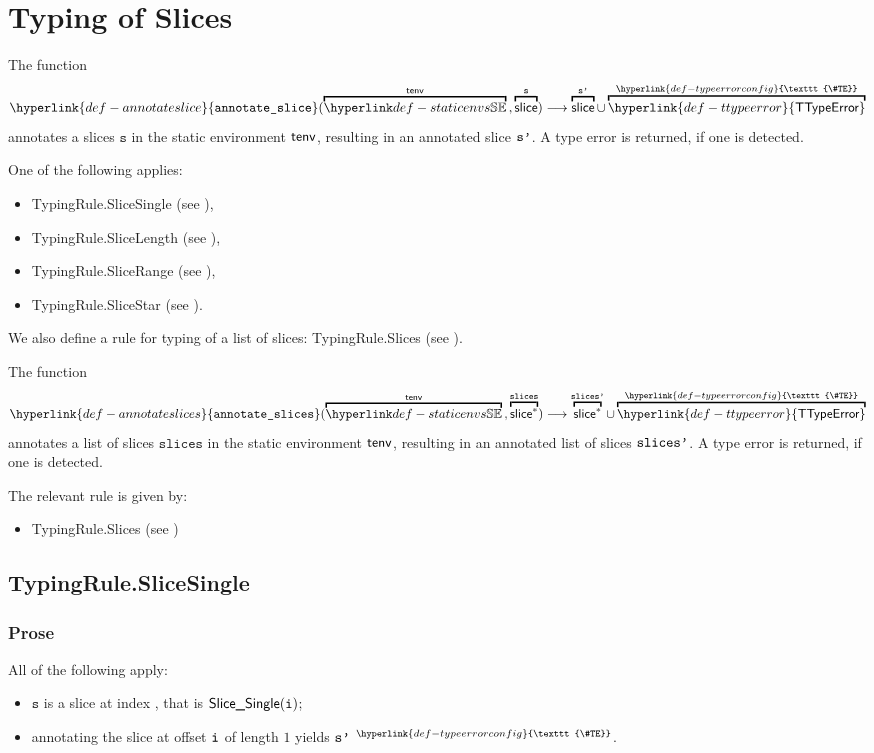 \documentclass{book}
\newcommand\TTypeError[0]{\hyperlink{def-ttypeerror}{\textsf{TTypeError}}}
\newcommand\TypeErrorConfig[0]{\hyperlink{def-typeerrorconfig}{\texttt{\#TE}}}
\newcommand\ProseOrTypeError[0]{\hyperlink{def-proseortypeerror}{$^{\TypeErrorConfig}$}}
\newcommand\annotateslice[0]{\hyperlink{def-annotateslice}{\texttt{annotate\_slice}}}
\newcommand\annotateslices[0]{\hyperlink{def-annotateslices}{\texttt{annotate\_slices}}}
\newcommand\vs[0]{\texttt{s}}
\newcommand\slices[0]{\texttt{slices}}
\begin{document}
\chapter{Typing of Slices \label{chap:typingslices}}
\hypertarget{def-annotateslice}{}
The function
\[
  \annotateslice(\overname{\staticenvs}{\tenv} \aslsep \overname{\slice}{\vs})
  \aslto
  \overname{\slice}{\vsp} \cup \overname{\TTypeError}{\TypeErrorConfig}
\]
annotates a slices $\vs$ in the static environment $\textsf{tenv}$,
resulting in an annotated slice $\texttt{s'}$.
A type error is returned, if one is detected.

One of the following applies:
\begin{itemize}
\item TypingRule.SliceSingle (see ),
\item TypingRule.SliceLength (see ),
\item TypingRule.SliceRange (see ),
\item TypingRule.SliceStar (see ).
\end{itemize}

We also define a rule for typing of a list of slices:
TypingRule.Slices (see ).

\hypertarget{def-annotateslices}{}
The function
\[
  \annotateslices(\overname{\staticenvs}{\tenv} \aslsep \overname{\slice^*}{\slices})
  \aslto
  \overname{\slice^*}{\slicesp} \cup \overname{\TTypeError}{\TypeErrorConfig}
\]
annotates a list of slices $\slices$ in the static environment $\textsf{tenv}$,
resulting in an annotated list of slices $\texttt{slices'}$.
A type error is returned, if one is detected.

The relevant rule is given by:
\begin{itemize}
  \item TypingRule.Slices (see )
\end{itemize}

\section{TypingRule.SliceSingle \label{sec:TypingRule.SliceSingle}}

\subsection{Prose}
All of the following apply:
\begin{itemize}
  \item $\vs$ is a slice at index \vi, that is $\textsf{Slice\_Single}(\texttt{i})$;
  \item annotating the slice at offset $\texttt{i}$ of length $1$ yields $\texttt{s'}$ \ProseOrTypeError.
\end{itemize}
\end{document}
